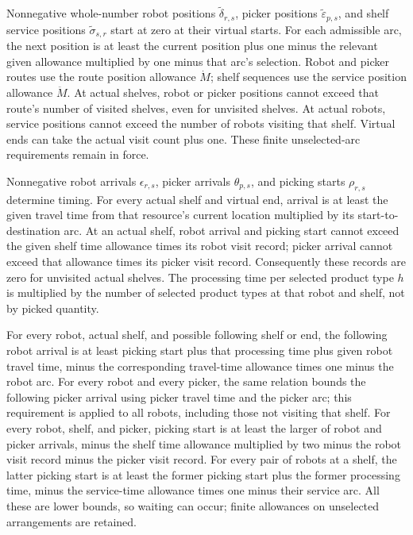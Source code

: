 \documentclass[10pt]{article}
\begin{document}
Nonnegative whole-number robot positions $\tilde\delta_{r,s}$, picker positions $\tilde\varepsilon_{p,s}$, and shelf service positions $\tilde\sigma_{s,r}$ start at zero at their virtual starts. For each admissible arc, the next position is at least the current position plus one minus the relevant given allowance multiplied by one minus that arc's selection. Robot and picker routes use the route position allowance $\dot M$; shelf sequences use the service position allowance $\ddot M$. At actual shelves, robot or picker positions cannot exceed that route's number of visited shelves, even for unvisited shelves. At actual robots, service positions cannot exceed the number of robots visiting that shelf. Virtual ends can take the actual visit count plus one. These finite unselected-arc requirements remain in force.

Nonnegative robot arrivals $\epsilon_{r,s}$, picker arrivals $\theta_{p,s}$, and picking starts $\rho_{r,s}$ determine timing. For every actual shelf and virtual end, arrival is at least the given travel time from that resource's current location multiplied by its start-to-destination arc. At an actual shelf, robot arrival and picking start cannot exceed the given shelf time allowance times its robot visit record; picker arrival cannot exceed that allowance times its picker visit record. Consequently these records are zero for unvisited actual shelves. The processing time per selected product type $h$ is multiplied by the number of selected product types at that robot and shelf, not by picked quantity.

For every robot, actual shelf, and possible following shelf or end, the following robot arrival is at least picking start plus that processing time plus given robot travel time, minus the corresponding travel-time allowance times one minus the robot arc. For every robot and every picker, the same relation bounds the following picker arrival using picker travel time and the picker arc; this requirement is applied to all robots, including those not visiting that shelf. For every robot, shelf, and picker, picking start is at least the larger of robot and picker arrivals, minus the shelf time allowance multiplied by two minus the robot visit record minus the picker visit record. For every pair of robots at a shelf, the latter picking start is at least the former picking start plus the former processing time, minus the service-time allowance times one minus their service arc. All these are lower bounds, so waiting can occur; finite allowances on unselected arrangements are retained.
\end{document}
